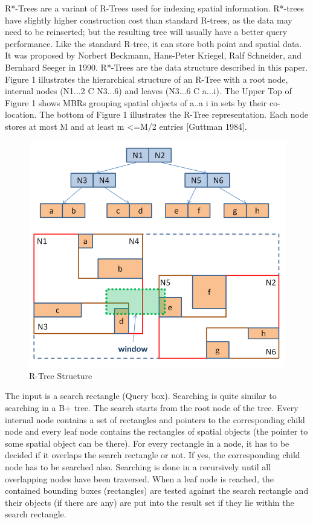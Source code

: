 	R*-Trees are a variant of R-Trees used for indexing spatial information. R*-trees have slightly higher construction cost than standard R-trees, as the data may need to be reinserted; but the resulting tree will usually have a better query performance. Like the standard R-tree, it can store both point and spatial data. It was proposed by Norbert Beckmann, Hans-Peter Kriegel, Ralf Schneider, and Bernhard Seeger in 1990. R*-Trees are the data structure described in this paper.
Figure 1 illustrates the hierarchical structure of an R-Tree with a root node, internal nodes (N1...2 C N3...6) and leaves (N3...6 C a...i). The Upper Top of Figure 1 shows MBRs grouping spatial objects of a..a i in sets by their co-location. The bottom of Figure 1 illustrates the R-Tree representation. Each node stores at most M and at least m <=M/2 entries [Guttman 1984].

\begin{figure}[ht]
\centering
\includegraphics[width=.5\textwidth]{r-tree-structure.png}
\caption{R-Tree Structure}
\label{fig:R-Tree Structure}
\end{figure}

The input is a search rectangle (Query box). Searching is quite similar to searching in a B+ tree. The search starts from the root node of the tree. Every internal node contains a set of rectangles and pointers to the corresponding child node and every leaf node contains the rectangles of spatial objects (the pointer to some spatial object can be there). For every rectangle in a node, it has to be decided if it overlaps the search rectangle or not. If yes, the corresponding child node has to be searched also. Searching is done in a recursively until all overlapping nodes have been traversed. When a leaf node is reached, the contained bounding boxes (rectangles) are tested against the search rectangle and their objects (if there are any) are put into the result set if they lie within the search rectangle.
	
